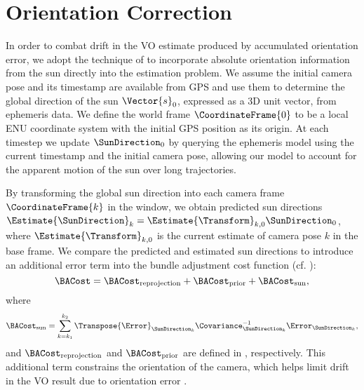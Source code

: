 \section{Orientation Correction}
In order to combat drift in the VO estimate produced by accumulated orientation error, we adopt the technique of \citet{Lambert2012-um} to incorporate absolute orientation information from the sun directly into the estimation problem.
We assume the initial camera pose and its timestamp are available from GPS and use them to determine the global direction of the sun $\Vector{s}_0$, expressed as a 3D unit vector, from ephemeris data.
We define the world frame $\CoordinateFrame{0}$ to be a local ENU coordinate system with the initial GPS position as its origin.
At each timestep we update $\SunDirection_0$ by querying the ephemeris model using the current timestamp and the initial camera pose, allowing our model to account for the apparent motion of the sun over long trajectories.

By transforming the global sun direction into each camera frame $\CoordinateFrame{k}$ in the window, we obtain predicted sun directions $\Estimate{\SunDirection}_k = \Estimate{\Transform}_{k,0} \SunDirection_0$, where $\Estimate{\Transform}_{k,0}$ is the current estimate of camera pose $k$ in the base frame. 
We compare the predicted and estimated sun directions to introduce an additional error term into the bundle adjustment cost function (cf. ):
\begin{equation} \label{eq:cost_function_with_sun}
    \BACost = \BACost_\text{reprojection} + \BACost_\text{prior} + \BACost_\text{sun},
\end{equation}
where 
\begin{equation} \label{eq:sun_cost}
	\BACost_\text{sun} = \sum_{k=k_1}^{k_2} \Transpose{\Error}_{\SunDirection_k} \Covariance^{-1}_{\SunDirection_k} \Error_{\SunDirection_k},
\end{equation}
and $\BACost_\text{reprojection}$ and $\BACost_\text{prior}$ are defined in , respectively.
This additional term constrains the orientation of the camera, which helps limit drift in the VO result due to orientation error \citep{Lambert2012-um}.

